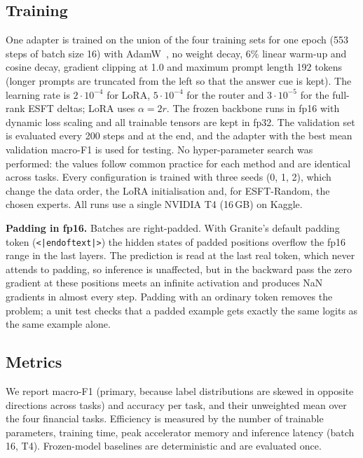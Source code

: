 \subsection{Training}
One adapter is trained on the union of the four training sets for one epoch (553 steps of
batch size 16) with AdamW~\cite{loshchilov2019adamw}, no weight decay, 6\% linear warm-up and
cosine decay, gradient clipping at 1.0 and maximum prompt length 192 tokens (longer prompts are
truncated from the left so that the answer cue is kept). The learning rate
is $2\cdot10^{-4}$ for LoRA, $5\cdot10^{-4}$ for the router and $3\cdot10^{-5}$ for the
full-rank ESFT deltas; LoRA uses $\alpha=2r$. The frozen backbone runs in fp16 with dynamic
loss scaling and all trainable tensors are kept in fp32. The validation set is evaluated every 200 steps and at
the end, and the adapter with the best mean validation macro-F1 is used for testing. No
hyper-parameter search was performed: the values follow common practice for each method and
are identical across tasks. Every configuration is trained with three seeds (0, 1, 2), which
change the data order, the LoRA initialisation and, for ESFT-Random, the chosen experts. All
runs use a single NVIDIA T4 (16\,GB) on Kaggle.

\textbf{Padding in fp16.} Batches are right-padded. With Granite's default padding token
(\texttt{<|endoftext|>}) the hidden states of padded positions overflow the fp16 range in the
last layers. The prediction is read at the last real token, which never attends to padding, so
inference is unaffected, but in the backward pass the zero gradient at these positions meets
an infinite activation and produces NaN gradients in almost every step. Padding with an ordinary token removes
the problem; a unit test checks that a padded example gets exactly the same logits as the
same example alone.

\subsection{Metrics}
We report macro-F1 (primary, because label distributions are skewed in opposite directions
across tasks) and accuracy per task, and their unweighted mean over the four financial tasks.
Efficiency is measured by the number of trainable parameters, training time, peak accelerator
memory and inference latency (batch 16, T4). Frozen-model baselines are deterministic and are
evaluated once.
